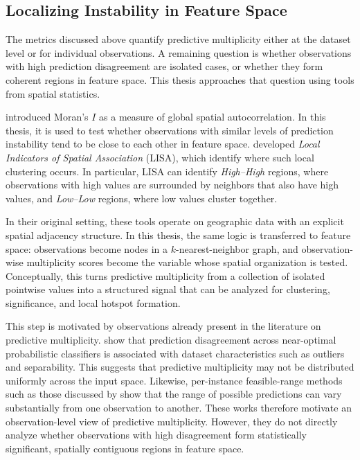 \subsection{Localizing Instability in Feature Space}
\label{sec:spatial-review}

The metrics discussed above quantify predictive multiplicity either at the dataset level
or for individual observations. A remaining question is whether observations with high
prediction disagreement are isolated cases, or whether they form coherent regions in
feature space. This thesis approaches that question using tools from spatial statistics.

\cite{moran1950notes} introduced Moran's $I$ as a measure of global spatial
autocorrelation. In this thesis, it is used to test whether observations with similar
levels of prediction instability tend to be close to each other in feature space.
\cite{anselin1995local} developed \emph{Local Indicators of Spatial Association} (LISA),
which identify where such local clustering occurs. In particular, LISA can identify
\emph{High--High} regions, where observations with high values are surrounded by
neighbors that also have high values, and \emph{Low--Low} regions, where low values
cluster together.

In their original setting, these tools operate on geographic data with an explicit spatial
adjacency structure. In this thesis, the same logic is transferred to
feature space: observations become nodes in a $k$-nearest-neighbor graph, and
observation-wise multiplicity scores become the variable whose spatial organization is
tested. Conceptually, this turns predictive multiplicity from a collection of isolated
pointwise values into a structured signal that can be analyzed for clustering, significance,
and local hotspot formation.

This step is motivated by observations already present in the literature on predictive
multiplicity. \cite{watson-daniels_predictive_2023} show that prediction disagreement
across near-optimal probabilistic classifiers is associated with dataset characteristics such
as outliers and separability. This suggests that predictive multiplicity may not be
distributed uniformly across the input space. Likewise, per-instance feasible-range
methods such as those discussed by \cite{hsu_rashomongb_2024} show that the range of
possible predictions can vary substantially from one observation to another. These works
therefore motivate an observation-level view of predictive multiplicity. However, they do
not directly analyze whether observations with high disagreement form statistically
significant, spatially contiguous regions in feature space.

